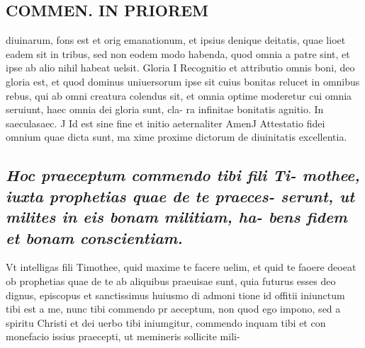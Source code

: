 \documentclass{article}
\begin{document}
\begin{pages}
\section*{COMMEN. IN PRIOREM }
\marginpar{[ p.38 ]}\pstart diuinarum, fons est et orig emanationum, et ipsius denique deitatis, quae lioet eadem sit in tribus, sed non eodem modo habenda, quod omnia a patre sint, et ipse ab alio nihil habeat uelsit.  \pend\pstart Gloria I Recognitio et attributio omnis boni, deo gloria est, et quod dominus uniuersorum ipse sit cuius bonitas relucet in omnibus rebus, qui ab omni creatura colendus sit, et omnia optime moderetur cui omnia seruiunt, haec omnia dei gloria sunt, cla- ra infinitae bonitatis agnitio.  \pend\pstart In saeculasaec. J Id est sine fine et initio aeternaliter AmenJ Attestatio fidei omnium quae dicta sunt, ma xime proxime dictorum de diuinitatis excellentia.  \pend
{}
{}
\subsection*{\textit{Hoc praeceptum commendo tibi fili Ti- mothee, iuxta prophetias quae de te praeces- serunt, ut milites in eis bonam militiam, ha- bens fidem et bonam conscientiam. }}\pstart Vt intelligas fili Timothee, quid maxime te facere uelim, et quid te faoere deoeat ob prophetias quae de te ab aliquibus praeuisae sunt, quia futurus esses deo dignus, episcopus et sanctissimus huiusmo di admoni tione id offitii iniunctum tibi est a me, nunc tibi commendo pr aeceptum, non quod ego impono, sed a spiritu Christi et dei uerbo tibi iniumgitur, commendo inquam tibi et con monefacio issius praecepti, ut memineris sollicite mili-  \pend

\end{pages}
\end{document}
